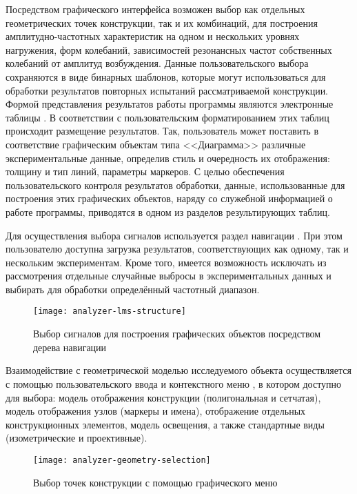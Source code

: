 Посредством графического интерфейса возможен выбор как отдельных геометрических точек конструкции, так и их комбинаций, для построения амплитудно-частотных характеристик на одном и нескольких уровнях нагружения, форм колебаний, зависимостей резонансных частот собственных колебаний от амплитуд возбуждения. Данные пользовательского выбора сохраняются в виде бинарных шаблонов, которые могут использоваться для обработки результатов повторных испытаний рассматриваемой конструкции. Формой представления результатов работы программы являются электронные таблицы . В соответствии с пользовательским форматированием этих таблиц происходит размещение результатов. Так, пользователь может поставить в соответствие графическим объектам типа <<Диаграмма>> различные экспериментальные данные, определив стиль и очередность их отображения: толщину и тип линий, параметры маркеров. С целью обеспечения пользовательского контроля результатов обработки, данные, использованные для построения этих графических объектов, наряду со служебной информацией о работе программы, приводятся в одном из разделов результирующих таблиц.

Для осуществления выбора сигналов используется раздел навигации  . При этом пользователю доступна загрузка результатов, соответствующих как одному, так и нескольким экспериментам. Кроме того, имеется возможность исключать из рассмотрения отдельные случайные выбросы в экспериментальных данных и выбирать для обработки определённый частотный диапазон.

\begin{figure}[!htb]
	\centerfloat
	\texttt{[image: analyzer-lms-structure]}
	\caption{Выбор сигналов для построения графических объектов посредством дерева навигации } \label{fig:analyzer-lms-structure}
\end{figure}

Взаимодействие с геометрической моделью исследуемого объекта осуществляется с помощью пользовательского ввода и контекстного меню , в котором доступно для выбора: модель отображения конструкции (полигональная и сетчатая), модель отображения узлов (маркеры и имена), отображение отдельных конструкционных элементов, модель освещения, а также стандартные виды (изометрические и проективные).

\begin{figure}[!htb]
	\centerfloat
	\texttt{[image: analyzer-geometry-selection]}
	\caption{Выбор точек конструкции с помощью графического меню} \label{fig:analyzer-geometry-selection}
\end{figure}

